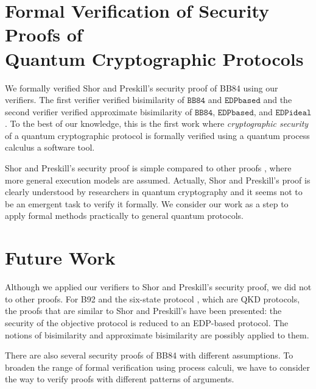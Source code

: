 \section{Formal Verification of Security Proofs of\\
Quantum Cryptographic Protocols}
We formally verified Shor and Preskill's security proof of BB84
\cite{ShorPreskill2000} using our verifiers.
The first verifier verified bisimilarity of $\mathtt{BB84}$ and
$\mathtt{EDPbased}$ and the second verifier
verified approximate bisimilarity of $\mathtt{BB84}$,
$\mathtt{EDPbased}$, and $\mathtt{EDPideal}$.
To the best of our knowledge, 
this is the first work where \emph{cryptographic security} of
a quantum cryptographic protocol 
is formally verified using a quantum process calculus 
a software tool.

Shor and Preskill's security proof is simple compared to
other proofs \cite{Mayers2001, KoashiPreskill2003}, where more general
execution models are assumed.
Actually,
Shor and Preskill's proof is clearly understood by researchers
in quantum cryptography \cite{Mayers2001, KoashiPreskill2003, Lo2003}
and it seems not to be an emergent task to verify it formally.
We consider our work as a step to
apply formal methods practically to general quantum protocols.

\section{Future Work}
Although we applied our verifiers to Shor and Preskill's security proof,
we did not to other proofs. For B92 and \cite{Bennett1992}
the six-state protocol \cite{Bruss1998}, which are QKD protocols,
the proofs \cite{TamakiKoashiImoto2003, Lo2001} that are similar to Shor
and Preskill's have been presented:
the security of the objective protocol is reduced to an EDP-based
protocol. The notions of bisimilarity and
approximate bisimilarity are possibly applied to them.

There are also several security proofs of BB84 with different
assumptions. To broaden the range of formal verification using
process calculi, we have to consider the way to verify proofs
with different patterns of arguments.

